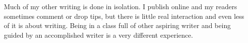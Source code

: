 \documentclass[12pt,letterpaper]{article}
\begin{document}
Much of my other writing is done in isolation. I publish online and my readers sometimes comment or drop tips, but there is little real interaction and even less of it is about writing. Being in a class full of other aspiring writer and being guided by an accomplished writer is a very different experience. 

\end{document}
